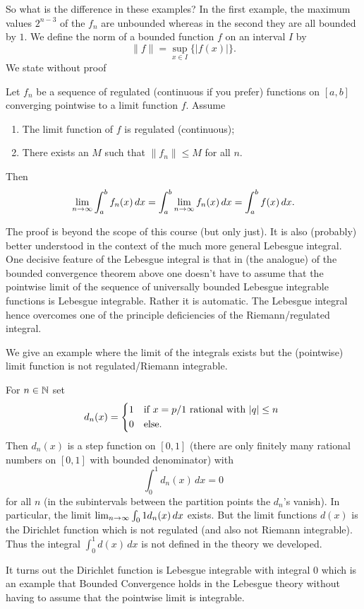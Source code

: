 \documentclass[10pt, a4paper]{article}
\begin{document}
So what is the difference in these examples?
In the first example,
the maximum values $2 ^ {n - 3}$ of the $f_n$ are unbounded whereas in the second they are all bounded by $1$.
We define the norm of a bounded function $f$ on an interval $I$ by
\[
\|f\| = \sup_{x \in I}\{|f(x)|\}.
\]
We state without proof
\begin{theorem}
    Let $f_n$ be a sequence of regulated
    (continuous if you prefer)
    functions on $[a, b]$ converging pointwise to a limit function $f$.
    Assume
    \begin{enumerate}[label = (\roman*)]
        \item The limit function of $f$ is regulated
        (continuous);

        \item There exists an $M$ such that $\|f_n\| \leq M$ for all $n$.
    \end{enumerate}
    Then
    \[
    \lim_{n \rightarrow \infty}\int_{a}^{b}f_n(x)\,dx = \int_{a}^{b}\lim_{n \rightarrow \infty} f_n(x)\,dx = \int_{a}^{b}f(x)\,dx.
    \]
\end{theorem}

\begin{remark}
    The proof is beyond the scope of this course
    (but only just).
    It is also
    (probably)
    better understood in the context of the much more general Lebesgue integral.
    One decisive feature of the Lebesgue integral is that in
    (the analogue)
    of the bounded convergence theorem above one doesn't have to assume that the pointwise limit of the sequence of universally bounded Lebesgue integrable functions is Lebesgue integrable.
    Rather it is automatic.
    The Lebesgue integral hence overcomes one of the principle deficiencies of the Riemann/regulated integral.
\end{remark}

We give an example where the limit of the integrals exists but the
(pointwise)
limit function is not regulated/Riemann integrable.

\begin{example}
    For $n \in \mathbb{N}$ set
    \[
    d_n(x) = \begin{dcases*}
        1 & if $x = p / 1$ rational with $|q| \leq n$ \\
        0 & else.
    \end{dcases*}
    \]
    Then $d_n(x)$ is a step function on $[0, 1]$
    (there are only finitely many rational numbers on $[0, 1]$ with bounded denominator)
    with
    \[
    \int_{0}^{1}d_n(x)\,dx = 0
    \]
    for all $n$
    (in the subintervals between the partition points the $d_n$'s vanish).
    In particular,
    the limit $\lim_{n \rightarrow \infty}\int_{0}1d_n(x)\,dx$ exists.
    But the limit functions $d(x)$ is the Dirichlet function which is not regulated
    (and also not Riemann integrable).
    Thus the integral $\int_{0}^{1}d(x)\,dx$ is not defined in the theory we developed.

    It turns out the Dirichlet function is Lebesgue integrable with integral $0$ which is an example that Bounded Convergence holds in the Lebesgue theory without having to assume that the pointwise limit is integrable.
\end{example}
\end{document}
